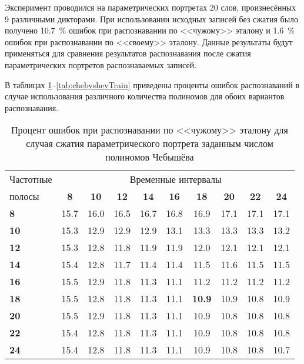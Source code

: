 Эксперимент проводился на параметрических портретах 20 слов, произнесённых 9 различными дикторами.
При использовании исходных записей без сжатия было получено 10.7~\% ошибок при распознавании по <<чужому>> эталону и 1.6~\% ошибок при распознавании по <<своему>> эталону.
Данные результаты будут применяться для сравнения результатов распознавания после сжатия параметрических портретов распознаваемых записей.

В таблицах \ref{tab:chebyshevTest}--\ref{tab:chebyshevTrain} приведены проценты ошибок распознаваний в случае использования различного количества полиномов для обоих вариантов распознавания.

\begin{table}[h]
	\centering
	\caption{Процент ошибок при распознавании по <<чужому>> эталону для случая сжатия параметрического портрета заданным числом полиномов Чебышёва}
	\label{tab:chebyshevTest}
	\begin{tabular}{| l | c | c | c | c | c | c | c | c | c |}
		\hline
		Частотные & \multicolumn{9}{c|}{Временные интервалы} \\
		\hhline{~---------}
	 	полосы & \phantom{0} \textbf{8} \phantom{0} & \phantom{0}\textbf{10} \phantom{0} & \phantom{0}\textbf{12} \phantom{0} & \phantom{0}\textbf{14} \phantom{0} & \phantom{0}\textbf{16} \phantom{0} & \phantom{0}\textbf{18} \phantom{0} & \phantom{0}\textbf{20} \phantom{0} & \phantom{0}\textbf{22} \phantom{0} & \phantom{0}\textbf{24} \phantom{0} \\
		\hline
		\textbf{8}  & 15.7 & 16.0 & 16.5 & 16.7 & 16.8 & 16.9 & 17.1 & 17.1 & 17.1 \\
		\textbf{10} & 15.3 & 12.9 & 12.9 & 12.9 & 13.1 & 13.3 & 13.3 & 13.3 & 13.2 \\
		\textbf{12} & 15.3 & 12.8 & 11.8 & 11.9 & 11.9 & 12.0 & 12.1 & 12.1 & 12.1 \\
		\textbf{14} & 15.4 & 12.8 & 11.7 & 11.4 & 11.4 & 11.5 & 11.6 & 11.5 & 11.5 \\
		\textbf{16}	& 15.5 & 12.9 & 11.8 & 11.3 & 11.1 & 11.2 & 11.2 & 11.2 & 11.2 \\
		\textbf{18} & 15.5 & 12.8 & 11.8 & 11.3 & 11.1 & \textbf{10.9} & 10.9 & 10.8 & 10.9 \\
		\textbf{20} & 15.5 & 12.9 & 11.8 & 11.3 & 11.1 & 10.9 & 10.8 & 10.8 & 10.8 \\
		\textbf{22} & 15.4 & 12.8 & 11.8 & 11.3 & 11.1 & 10.9 & 10.8 & 10.8 & 10.8 \\
		\textbf{24} & 15.4 & 12.8 & 11.8 & 11.3 & 11.1 & 10.9 & 10.8 & 10.8 & 10.7 \\
		\hline
	\end{tabular}
\end{table}

